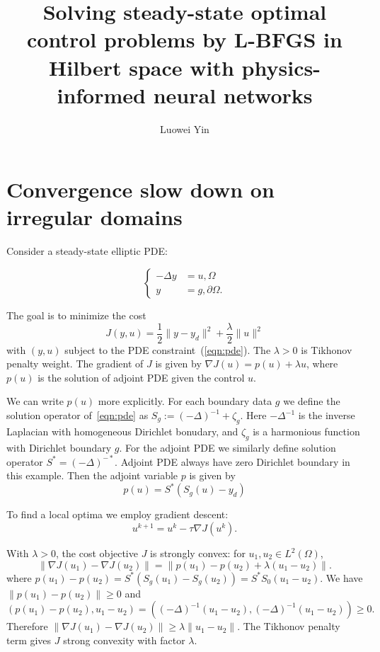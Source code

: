 \documentclass{article}
\title{Solving steady-state optimal control problems by L-BFGS in Hilbert space with physics-informed neural networks}
\author{Luowei Yin}
\begin{document}
\maketitle


\section{Convergence slow down on irregular domains}
Consider a steady-state elliptic PDE:\@

\begin{equation} \label{eqn:pde}
    \left\{
    \begin{aligned}
            -\Delta y &= u,\Omega \\ 
            y &= g,\partial \Omega.
    \end{aligned}
    \right.
\end{equation}


The goal is to minimize the cost
$$
J(y,u)=\frac{1}{2}\|y-y_d\|^2+\frac{\lambda}{2}\|u\|^2
$$
with $(y,u)$ subject to the PDE constraint~(\ref{eqn:pde}). The $\lambda>0$ is Tikhonov penalty weight. The gradient of $J$ is given by $\nabla J(u)=p(u)+\lambda u$, where $p(u)$ is the solution of adjoint PDE given the control $u$. 

We can write $p(u)$ more explicitly. For each boundary data $g$ we define the solution operator of~\ref{eqn:pde} as $S_g:={(-\Delta)}^{-1}+\zeta_g$. Here ${-\Delta}^{-1}$ is the inverse Laplacian with homogeneous Dirichlet bonudary, and $\zeta_g$ is a harmonious function with Dirichlet boundary $g$. For the adjoint PDE we similarly define solution operator $S^*={(-\Delta)}^{-*}$. Adjoint PDE always have zero Dirichlet boundary in this example. Then the adjoint variable $p$ is given by 
\[
p(u)=S^*(S_g(u)-y_d)
\]

To find a local optima we employ gradient descent:
\[
u^{k+1} = u^k - \tau \nabla J(u^k).
\]

With $\lambda>0$, the cost objective $J$ is strongly convex: for $u_1,u_2\in L^2(\Omega)$, 
\[
\|\nabla J(u_1)-\nabla J(u_2)\|=\|p(u_1)-p(u_2) + \lambda (u_1-u_2)\|.
\]
where $p(u_1)-p(u_2)=S^*(S_g(u_1)-S_g(u_2))=S^*S_0(u_1-u_2)$. We have $\|p(u_1)-p(u_2)\|\geq0$ and 
\[
    (p(u_1)-p(u_2),u_1-u_2)=({(-\Delta)}^{-1}(u_1-u_2),{(-\Delta)}^{-1}(u_1-u_2))\geq0.
\]
Therefore $\|\nabla J(u_1)-\nabla J(u_2)\|\geq\lambda\|u_1-u_2\|$. The Tikhonov penalty term gives $J$ strong convexity with factor $\lambda$.
\end{document}
